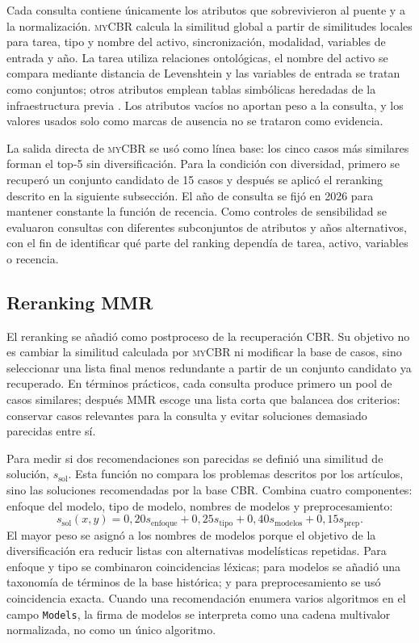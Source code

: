 \documentclass[11pt,a4paper]{article}
\newcommand{\myCBR}{\textsc{myCBR}}
\begin{document}
Cada consulta contiene únicamente los atributos que sobrevivieron al puente y a la normalización. \myCBR{} calcula la similitud global a partir de similitudes locales para tarea, tipo y nombre del activo, sincronización, modalidad, variables de entrada y año. La tarea utiliza relaciones ontológicas, el nombre del activo se compara mediante distancia de Levenshtein y las variables de entrada se tratan como conjuntos; otros atributos emplean tablas simbólicas heredadas de la infraestructura previa \citep{Sanchez2012SemanticSimilarity,MonteroJimenez2021OPMADCBR}. Los atributos vacíos no aportan peso a la consulta, y los valores usados solo como marcas de ausencia no se trataron como evidencia.

La salida directa de \myCBR{} se usó como línea base: los cinco casos más similares forman el top-5 sin diversificación. Para la condición con diversidad, primero se recuperó un conjunto candidato de 15 casos y después se aplicó el reranking descrito en la siguiente subsección. El año de consulta se fijó en 2026 para mantener constante la función de recencia. Como controles de sensibilidad se evaluaron consultas con diferentes subconjuntos de atributos y años alternativos, con el fin de identificar qué parte del ranking dependía de tarea, activo, variables o recencia.

\subsection{Reranking MMR}
\label{sec:mmr}

El reranking se añadió como postproceso de la recuperación CBR. Su objetivo no es cambiar la similitud calculada por \myCBR{} ni modificar la base de casos, sino seleccionar una lista final menos redundante a partir de un conjunto candidato ya recuperado. En términos prácticos, cada consulta produce primero un pool de casos similares; después MMR escoge una lista corta que balancea dos criterios: conservar casos relevantes para la consulta y evitar soluciones demasiado parecidas entre sí.

Para medir si dos recomendaciones son parecidas se definió una similitud de solución, $s_{\mathrm{sol}}$. Esta función no compara los problemas descritos por los artículos, sino las soluciones recomendadas por la base CBR. Combina cuatro componentes: enfoque del modelo, tipo de modelo, nombres de modelos y preprocesamiento:
\begin{equation}
 s_{\mathrm{sol}}(x,y)=0{,}20s_{\mathrm{enfoque}}+0{,}25s_{\mathrm{tipo}}+0{,}40s_{\mathrm{modelos}}+0{,}15s_{\mathrm{prep}}.
 \label{eq:solution-sim}
\end{equation}
El mayor peso se asignó a los nombres de modelos porque el objetivo de la diversificación era reducir listas con alternativas modelísticas repetidas. Para enfoque y tipo se combinaron coincidencias léxicas; para modelos se añadió una taxonomía de términos de la base histórica; y para preprocesamiento se usó coincidencia exacta. Cuando una recomendación enumera varios algoritmos en el campo \texttt{Models}, la firma de modelos se interpreta como una cadena multivalor normalizada, no como un único algoritmo.
\end{document}
